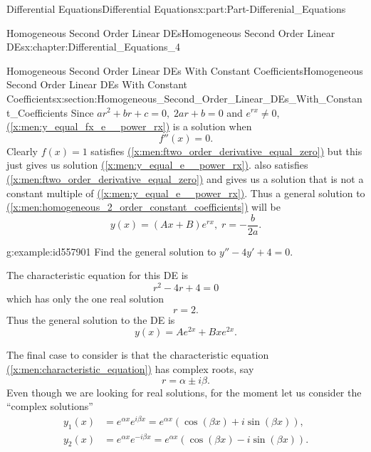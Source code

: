 \documentclass[oneside,10pt,]{book}
\newcommand{\xreffont}{\relax}
\numberwithin{equation}{section}
\newcommand{\amp}{&}
\begin{document}
\begin{partptx}{Differential Equations}{}{Differential Equations}{}{}{x:part:Part-Differenial_Equations}
\begin{chapterptx}{Homogeneous Second Order Linear DEs}{}{Homogeneous Second Order Linear DEs}{}{}{x:chapter:Differential_Equations_4}
\begin{sectionptx}{Homogeneous Second Order Linear DEs With Constant Coefficients}{}{Homogeneous Second Order Linear DEs With Constant Coefficients}{}{}{x:section:Homogeneous_Second_Order_Linear_DEs_With_Constant_Coefficients}
Since \(ar^{2}+br+c=0, \; 2ar+b=0 \) and \(e^{rx}\neq 0, \)  \hyperref[x:men:y_equal_fx_e__power_rx]{({\xreffont\ref{x:men:y_equal_fx_e__power_rx}})} is a solution when%
\begin{equation}
f''(x)=0.\label{x:men:ftwo_order_derivative_equal_zero}
\end{equation}
Clearly  \(f(x)=1 \) satisfies \hyperref[x:men:ftwo_order_derivative_equal_zero]{({\xreffont\ref{x:men:ftwo_order_derivative_equal_zero}})} but this just gives us solution \hyperref[x:men:y_equal_e__power_rx]{({\xreffont\ref{x:men:y_equal_e__power_rx}})}.   also satisfies \hyperref[x:men:ftwo_order_derivative_equal_zero]{({\xreffont\ref{x:men:ftwo_order_derivative_equal_zero}})} and gives us a solution that is not a constant multiple of \hyperref[x:men:y_equal_e__power_rx]{({\xreffont\ref{x:men:y_equal_e__power_rx}})}. Thus a general solution to \hyperref[x:men:homogeneous_2_order_constant_coefficients]{({\xreffont\ref{x:men:homogeneous_2_order_constant_coefficients}})} will be%
\begin{equation*}
y(x)=(Ax+B)e^{rx},\; r=-\frac{b}{2a}.
\end{equation*}
%
\begin{example}{}{g:example:id557901}%
Find the general solution to \(y''-4y'+4=0. \)%
\par
The characteristic equation for this DE is%
\begin{equation*}
r^{2}-4r+4=0
\end{equation*}
which has only the one real solution%
\begin{equation*}
r=2.
\end{equation*}
Thus the general solution to the DE is%
\begin{equation*}
y(x)=Ae^{2x} + Bxe^{2x}.
\end{equation*}
%
\end{example}
The final case to consider is that the characteristic equation \hyperref[x:men:characteristic_equation]{({\xreffont\ref{x:men:characteristic_equation}})} has complex roots, say%
\begin{equation*}
r=\alpha\pm i\beta .
\end{equation*}
Even though we are looking for real solutions, for the moment let us consider the “complex solutions”%
\begin{align*}
y_{1}(x) \amp =e^{\alpha x} e^{i \beta x} =e^{\alpha x} (\cos(\beta x) + i\sin(\beta x)),  \\
y_{2}(x) \amp =e^{\alpha x} e^{-i \beta x} =e^{\alpha x} (\cos(\beta x) - i\sin(\beta x)).  

\end{align*}
\end{sectionptx}
\end{chapterptx}
\end{partptx}
\end{document}
